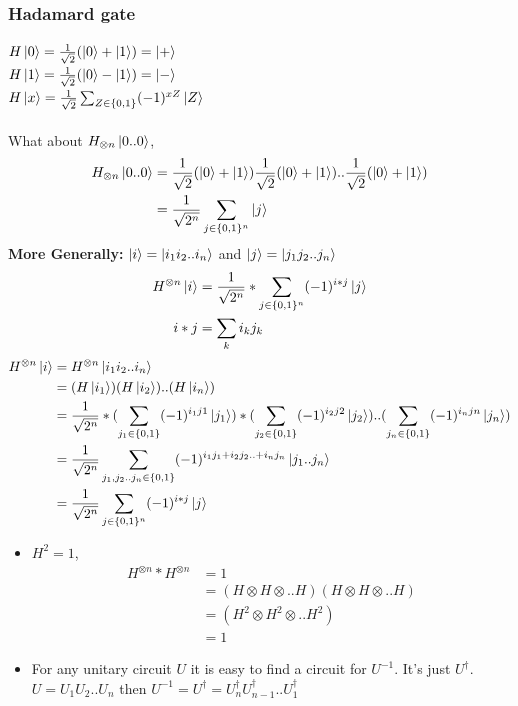 \documentclass[11.5pt, paper=a4]{article}
\theoremstyle{definition}
\numberwithin{theorem}{section}
\begin{document}
\subsubsection{Hadamard gate}
    $H\ket{0} = \frac{1}{\sqrt{2}}(\ket{0} + \ket{1}) = \ket{+}$\\
    $H\ket{1} = \frac{1}{\sqrt{2}}(\ket{0} - \ket{1}) = \ket{-}$\\
    $H\ket{x} = \frac{1}{\sqrt{2}}\sum_{Z \in \{0,1\}}(-1)^{xZ}\ket{Z}$\\ \\
    What about $H_{\otimes n}\ket{0..0}$,
    \begin{align*}
        H_{\otimes n}\ket{0..0} &= \frac{1}{\sqrt{2}}(\ket{0} + \ket{1})\frac{1}{\sqrt{2}}(\ket{0} + \ket{1})..\frac{1}{\sqrt{2}}(\ket{0} + \ket{1}) \\
        &= \frac{1}{\sqrt{2^{n}}}\sum_{j \in \{0, 1\}^{n}}\ket{j}
    \end{align*}
\newpage
\textbf{More Generally:} $\ket{i}=\ket{i_{1}i_{2}..i_{n}}$ and $\ket{j}=\ket{j_{1}j_{2}..j_{n}}$ \\
\begin{align*}
    H^{\otimes n}\ket{i} &= \frac{1}{\sqrt{2^{n}}}*\sum_{j \in \{0,1\}^{n}}(-1)^{i*j}\ket{j} \\
    i*j &= \sum_{k} i_{k} j_{k}
\end{align*}
\begin{align*}
    H^{\otimes n}\ket{i} &= H^{\otimes n}\ket{i_{1} i_{2} .. i_{n}} \\
    &= (H\ket{i_{1}})(H\ket{i_{2}})..(H\ket{i_{n}}) \\
    &= \frac{1}{\sqrt{2^{n}}}* (\sum_{j_{1} \in \{0,1\}}(-1)^{i_{1}j{1}}\ket{j_{1}}) * (\sum_{j_{2} \in \{0,1\}}(-1)^{i_{2}j{2}}\ket{j_{2}}) .. (\sum_{j_{n} \in \{0,1\}}(-1)^{i_{n}j{n}}\ket{j_{n}}) \\
    &= \frac{1}{\sqrt{2^{n}}} \sum_{j_{1}, j_{2} .. j_{n} \in \{0,1\}}(-1)^{i_{1}j_{1} + i_{2}j_{2} .. +i_{n}j_{n}} \ket{j_{1}..j_{n}}\\
    &= \frac{1}{\sqrt{2^{n}}} \sum_{j \in \{0,1\}^{n}} (-1)^{i*j} \ket{j}
\end{align*}
\begin{itemize}
    \item $H^{2} = 1$,
        \begin{align*}
            H^{\otimes n}*H^{\otimes n} &= 1 \\
            &= (H \otimes H \otimes .. H)(H \otimes H \otimes .. H) \\
            &= (H^{2} \otimes H^{2} \otimes .. H^{2}) \\
            &= 1
        \end{align*}
    \item For any unitary circuit $U$ it is easy to find a circuit for $U^{-1}$. It's just $U^{\dagger}$. \\
    $U = U_{1}U_{2}..U_{n}$ then $U^{-1} = U^{\dagger} = U_{n}^{\dagger}U_{n-1}^{\dagger}..U_{1}^{\dagger}$
\end{itemize}
\end{document}
